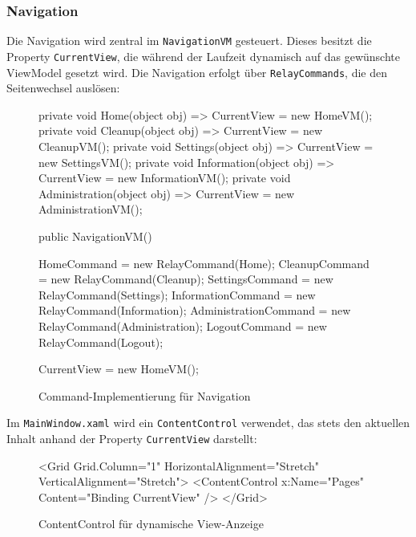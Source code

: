 \subsubsection*{Navigation}

Die Navigation wird zentral im \texttt{NavigationVM} gesteuert. Dieses besitzt die Property \texttt{CurrentView}, die während der Laufzeit dynamisch auf das gewünschte ViewModel gesetzt wird. Die Navigation erfolgt über \texttt{RelayCommands}, die den Seitenwechsel auslösen:

\begin{figure}[H]
    \centering
    \begin{cs}
private void Home(object obj) => CurrentView = new HomeVM();
private void Cleanup(object obj) => CurrentView = new CleanupVM();
private void Settings(object obj) => CurrentView = new SettingsVM();
private void Information(object obj) => CurrentView = new InformationVM();
private void Administration(object obj) => CurrentView = new AdministrationVM();

public NavigationVM()
{
    HomeCommand = new RelayCommand(Home);
    CleanupCommand = new RelayCommand(Cleanup);
    SettingsCommand = new RelayCommand(Settings);
    InformationCommand = new RelayCommand(Information);
    AdministrationCommand = new RelayCommand(Administration);
    LogoutCommand = new RelayCommand(Logout);

    CurrentView = new HomeVM();
}
\end{cs}

    \caption{Command-Implementierung für Navigation}
\end{figure}

Im \texttt{MainWindow.xaml} wird ein \texttt{ContentControl} verwendet, das stets den aktuellen Inhalt anhand der Property \texttt{CurrentView} darstellt:

\begin{figure}[H]
    \centering
    \begin{xamlcode}
<Grid Grid.Column="1" HorizontalAlignment="Stretch" VerticalAlignment="Stretch">
    <ContentControl x:Name="Pages" Content="{Binding CurrentView}" />
</Grid>
\end{xamlcode}
    \caption{ContentControl für dynamische View-Anzeige}
\end{figure}

